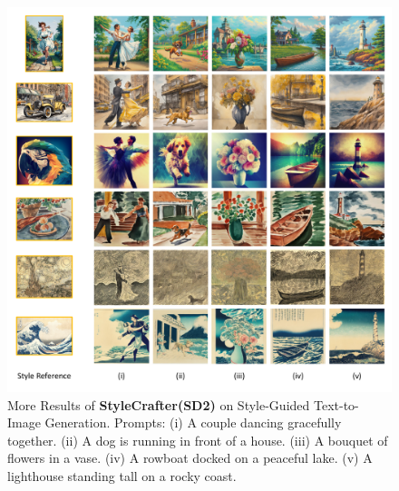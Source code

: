 \begin{figure}[p]
    \vspace*{\fill}
    \centering
    \includegraphics[width=\linewidth]{figures/supp/more_results_img_sd.pdf}
    \caption{More Results of \textbf{StyleCrafter(SD2)} on Style-Guided Text-to-Image Generation. Prompts: (i) A couple dancing gracefully together. (ii) A dog is running in front of a house. (iii) A bouquet of flowers in a vase. (iv) A rowboat docked on a peaceful lake. (v) A lighthouse standing tall on a rocky coast.} 
    \label{fig:supp_more_result_img_sd}
    \vspace*{\fill}
\end{figure}

